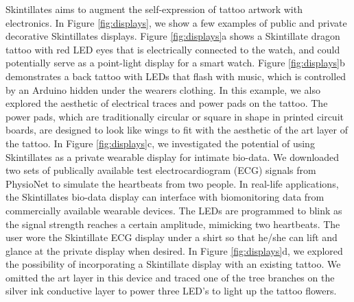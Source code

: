 \documentclass{sigchi}
\begin{document}
Skintillates aims to augment the self-expression of tattoo artwork with electronics. In Figure \ref{fig:displays}, we show a few examples of public and private decorative Skintillates displays. Figure \ref{fig:displays}a shows a Skintillate dragon tattoo with red LED eyes that is electrically connected to the watch, and could potentially serve as a point-light display for a smart watch. Figure \ref{fig:displays}b demonstrates a back tattoo with LEDs that flash with music, which is controlled by an Arduino hidden under the wearers clothing.  In this example, we also explored the aesthetic of electrical traces and power pads on the tattoo. The power pads, which are traditionally circular or square in shape in printed circuit boards, are designed to look like wings to fit with the aesthetic of the art layer of the tattoo. In Figure \ref{fig:displays}c, we investigated the potential of using Skintillates as a private wearable display for intimate bio-data. We downloaded two sets of publically available test electrocardiogram (ECG) signals from PhysioNet to simulate the heartbeats from two people. In real-life applications, the Skintillates bio-data display can interface with biomonitoring data from commercially available wearable devices. The LEDs are programmed to blink as the signal strength reaches a certain amplitude, mimicking two heartbeats. The user wore the Skintillate ECG display under a shirt so that he/she can lift and glance at the private display when desired. In Figure \ref{fig:displays}d, we explored the possibility of incorporating a Skintillate display with an existing tattoo. We omitted the art layer in this device and traced one of the tree branches on the silver ink conductive layer to power three LED’s to light up the tattoo flowers.
\end{document}
